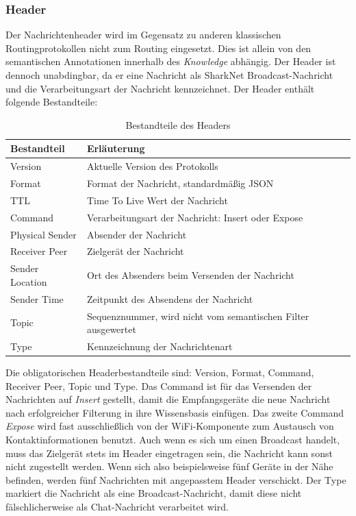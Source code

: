 \subsubsection{Header}
Der Nachrichtenheader wird im Gegensatz zu anderen klassischen Routingprotokollen nicht zum Routing eingesetzt. Dies ist allein von den semantischen Annotationen innerhalb des \textit{Knowledge} abhängig. Der Header ist dennoch unabdingbar, da er eine Nachricht als SharkNet Broadcast-Nachricht und die Verarbeitungsart der Nachricht kennzeichnet. Der Header enthält folgende Bestandteile:\\
\begin{table}[H]
	\begin{center}
		\begin{tabular}{l|l} 			
			Bestandteil & Erläuterung \\
			\hline
			Version & Aktuelle Version des Protokolls\\
			Format & Format der Nachricht, standardmäßig JSON\\
			TTL & Time To Live Wert der Nachricht\\
			Command & Verarbeitungsart der Nachricht: Insert oder Expose\\
			Physical Sender & Absender der Nachricht\\
			Receiver Peer & Zielgerät der Nachricht\\
			Sender Location & Ort des Absenders beim Versenden der Nachricht\\
			Sender Time & Zeitpunkt des Absendens der Nachricht\\
			Topic & Sequenznummer, wird nicht vom semantischen Filter ausgewertet\\
			Type & Kennzeichnung der Nachrichtenart\\							
		\end{tabular}
		\caption{Bestandteile des Headers}
		\label{tab:messageHeader}
	\end{center}
\end{table}
Die obligatorischen Headerbestandteile sind: Version, Format, Command, Receiver Peer, Topic und Type. Das Command ist für das Versenden der Nachrichten auf \textit{Insert} gestellt, damit die Empfangsgeräte die neue Nachricht nach erfolgreicher Filterung in ihre Wissensbasis einfügen. Das zweite Command \textit{Expose} wird fast ausschließlich von der WiFi-Komponente zum Austausch von Kontaktinformationen benutzt. Auch wenn es sich um einen Broadcast handelt, muss das Zielgerät stets im Header eingetragen sein, die Nachricht kann sonst nicht zugestellt werden. Wenn sich also beispielsweise fünf Geräte in der Nähe befinden, werden fünf Nachrichten mit angepasstem Header verschickt. Der Type markiert die Nachricht als eine Broadcast-Nachricht, damit diese nicht fälschlicherweise als Chat-Nachricht verarbeitet wird.\newpage
